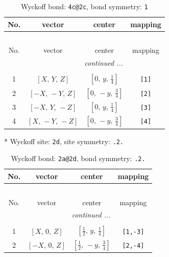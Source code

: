 \documentclass[fleqn,8pt]{jsarticle}
\begin{document}
\begin{longtable}{cccc}
\caption{Wyckoff bond: {\tt 4c@2c}, bond symmetry: {\tt 1}}
 \\
 \hline \hline
No. & vector & center & mapping \\ \hline \endfirsthead

\multicolumn{3}{l}{\tablename\ \thetable{}} \\
 \hline \hline
No. & vector & center & mapping \\ \hline \endhead

 \hline \hline
\multicolumn{3}{r}{\footnotesize\it continued ...} \\ \endfoot

 \hline \hline
\multicolumn{3}{r}{} \\ \endlastfoot

1 & $\left[ X,\, Y,\, Z \right]$ & $\left[ 0,\, y,\, \frac{1}{4} \right]$ & {\tt [1]} \\ \hline
2 & $\left[ - X,\, - Y,\, Z \right]$ & $\left[ 0,\, - y,\, \frac{3}{4} \right]$ & {\tt [2]} \\ \hline
3 & $\left[ - X,\, Y,\, - Z \right]$ & $\left[ 0,\, y,\, \frac{1}{4} \right]$ & {\tt [3]} \\ \hline
4 & $\left[ X,\, - Y,\, - Z \right]$ & $\left[ 0,\, - y,\, \frac{3}{4} \right]$ & {\tt [4]} \\
\end{longtable}
* Wyckoff site: {\tt 2d}, site symmetry: {\tt .2.}
\renewcommand{\arraystretch}{1.2}
\begin{longtable}{cccc}
\caption{Wyckoff bond: {\tt 2a@2d}, bond symmetry: {\tt .2.}}
 \\
 \hline \hline
No. & vector & center & mapping \\ \hline \endfirsthead

\multicolumn{3}{l}{\tablename\ \thetable{}} \\
 \hline \hline
No. & vector & center & mapping \\ \hline \endhead

 \hline \hline
\multicolumn{3}{r}{\footnotesize\it continued ...} \\ \endfoot

 \hline \hline
\multicolumn{3}{r}{} \\ \endlastfoot

1 & $\left[ X,\, 0,\, Z \right]$ & $\left[ \frac{1}{2},\, y,\, \frac{1}{4} \right]$ & {\tt [1,-3]} \\ \hline
2 & $\left[ - X,\, 0,\, Z \right]$ & $\left[ \frac{1}{2},\, - y,\, \frac{3}{4} \right]$ & {\tt [2,-4]} \\
\end{longtable}
\end{document}
